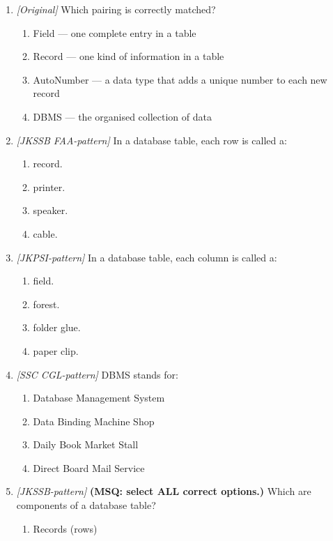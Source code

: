 \begin{enumerate}[label=\textbf{Q\arabic*.}, leftmargin=*]
\begin{enumerate}[label=\Alph*.]
    \item I, II, and III
  \end{enumerate}
\item \textit{[Original]} Which pairing is correctly matched?
  \begin{enumerate}[label=\Alph*.]
    \item Field --- one complete entry in a table
    \item Record --- one kind of information in a table
    \item AutoNumber --- a data type that adds a unique number to each new
      record
    \item DBMS --- the organised collection of data
  \end{enumerate}

\item \textit{[JKSSB FAA-pattern]} In a database table, each row is called a:
  \begin{enumerate}[label=\Alph*.]
    \item record.
    \item printer.
    \item speaker.
    \item cable.
  \end{enumerate}
\item \textit{[JKPSI-pattern]} In a database table, each column is called a:
  \begin{enumerate}[label=\Alph*.]
    \item field.
    \item forest.
    \item folder glue.
    \item paper clip.
  \end{enumerate}
\item \textit{[SSC CGL-pattern]} DBMS stands for:
  \begin{enumerate}[label=\Alph*.]
    \item Database Management System
    \item Data Binding Machine Shop
    \item Daily Book Market Stall
    \item Direct Board Mail Service
  \end{enumerate}
\item \textit{[JKSSB-pattern]} \textbf{(MSQ: select ALL correct options.)} Which are components of a database table?
  \begin{enumerate}[label=\Alph*.]
    \item Records (rows)

\end{enumerate}
\end{enumerate}
